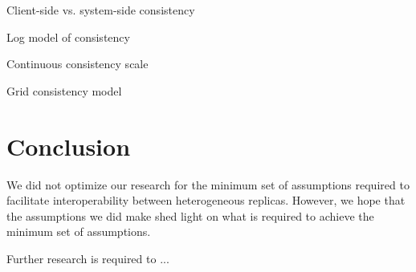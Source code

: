 Client-side vs. system-side consistency

Log model of consistency

Continuous consistency scale

Grid consistency model


\section{Conclusion}

We did not optimize our research for the minimum set of assumptions required to facilitate interoperability between heterogeneous replicas.
However, we hope that the assumptions we did make shed light on what is required to achieve the minimum set of assumptions.

Further research is required to ...
